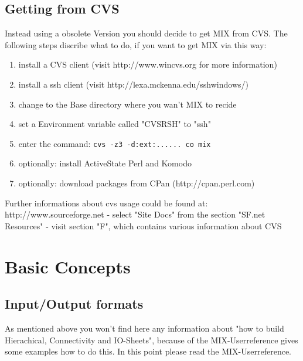 \documentclass[a4paper,12pt]{article}
\begin{document}
\subsection{Getting from CVS}
Instead using a obsolete Version you should decide to get MIX from CVS. The following steps discribe what to do, if you want to get MIX via this way:
\begin{enumerate}
\item{install a CVS client (visit http://www.wincvs.org for more information)}
\item{install a ssh client (visit http://lexa.mckenna.edu/sshwindows/)}
\item{change to the Base directory where you wan't MIX to recide}
\item{set a Environment variable called "CVSRSH" to "ssh"}
\item{enter the command: \tt{cvs -z3 -d:ext:...... co mix}}
\item{optionally: install ActiveState Perl and Komodo}
\item{optionally: download packages from CPan (http://cpan.perl.com)}
\end{enumerate}
Further informations about cvs usage could be found at: http://www.sourceforge.net\newline
\hspace*{10mm}- select "Site Docs" from the section "SF.net Resources"\newline
\hspace*{10mm}- visit section "F", which contains various information about CVS


\section{Basic Concepts}
\subsection{Input/Output formats}
As mentioned above you won't find here any information about "how to build Hierachical, Connectivity and IO-Sheets", because of the MIX-Userreference gives some examples how to do this. In this point please read the MIX-Userreference.
\end{document}
